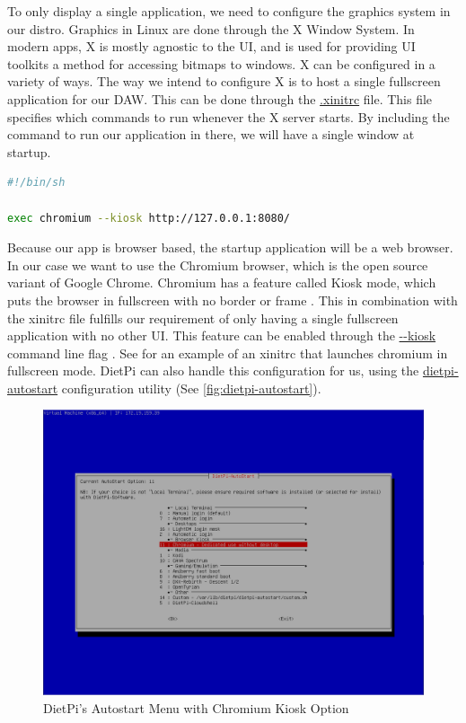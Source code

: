 To only display a single application, we need to configure the graphics system in our
distro. Graphics in Linux are done through the X Window System. In modern apps, X is
mostly agnostic to the UI, and is used for providing UI toolkits a method for accessing
bitmaps to windows. X can be configured in a variety of ways. The way we intend to
configure X is to host a single fullscreen application for our DAW. This can be done
through the \url{.xinitrc} file. This file specifies which commands to run whenever the X
server starts. By including the command to run our application in there, we will have a
single window at startup.

\begin{lstlisting}[language=bash, label={lst:xinitrc}, caption=Example .xinitrc]
#!/bin/sh

exec chromium --kiosk http://127.0.0.1:8080/
\end{lstlisting}

Because our app is browser based, the startup application will be a web browser. In our
case we want to use the Chromium browser, which is the open source variant of Google
Chrome. Chromium has a feature called Kiosk mode, which puts the browser in fullscreen
with no border or frame \autocite{chromiumKioskMode}. This in combination with the xinitrc
file fulfills our requirement of only having a single fullscreen application with no other
UI. This feature can be enabled through the \url{--kiosk} command line flag
\autocite{chromiumKioskMode}. See  for an example of an xinitrc that
launches chromium in fullscreen mode. DietPi can also handle this configuration for us,
using the \url{dietpi-autostart} configuration utility (See
\autoref{fig:dietpi-autostart}).

\begin{figure}[h!]
  \centering
  \includegraphics[width=\linewidth]{image/dietpi-autostart.png}
  \caption{DietPi's Autostart Menu with Chromium Kiosk Option}
  \label{fig:dietpi-autostart}
\end{figure}

